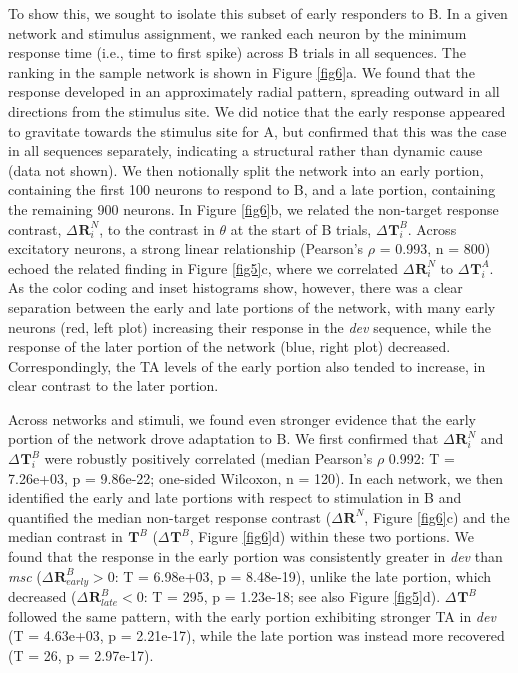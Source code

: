 \documentclass[pdflatex,referee,iicol,sn-basic]{sn-jnl}
\newcommand{\dev}{\textit{dev}}
\newcommand{\msc}{\textit{msc}}
\renewcommand{\R}[3][]{{}^{#1}_{}\mathbf{R}^{#2}_{#3}}
\renewcommand{\T}[3][]{{}^{#1}_{}\mathbf{T}^{#2}_{#3}}
\newcommand{\refpanel}[2]{Figure \ref{fig#1}\lowercase{#2}}
\begin{document}
To show this, we sought to isolate this subset of early responders to B. In a given network and stimulus assignment, we ranked each neuron by the minimum response time (i.e., time to first spike) across B trials in all sequences. The ranking in the sample network is shown in \refpanel{6}{a}. We found that the response developed in an approximately radial pattern, spreading outward in all directions from the stimulus site. We did notice that the early response appeared to gravitate towards the stimulus site for A, but confirmed that this was the case in all sequences separately, indicating a structural rather than dynamic cause (data not shown). We then notionally split the network into an early portion, containing the first 100 neurons to respond to B, and a late portion, containing the remaining 900 neurons. In \refpanel{6}{b}, we related the non-target response contrast, $\Delta \R{N}{i}$, to the contrast in $\theta$ at the start of B trials, $\Delta \T{B}{i}$. Across excitatory neurons, a strong linear relationship (Pearson's $\rho$ = 0.993, n = 800) echoed the related finding in \refpanel{5}{c}, where we correlated $\Delta \R{N}{i}$ to $\Delta \T{A}{i}$. As the color coding and inset histograms show, however, there was a clear separation between the early and late portions of the network, with many early neurons (red, left plot) increasing their response in the \dev{} sequence, while the response of the later portion of the network (blue, right plot) decreased. Correspondingly, the TA levels of the early portion also tended to increase, in clear contrast to the later portion.

Across networks and stimuli, we found even stronger evidence that the early portion of the network drove adaptation to B. We first confirmed that $\Delta \R{N}{i}$ and $\Delta \T{B}{i}$ were robustly positively correlated (median Pearson's $\rho$ 0.992: T = 7.26e+03, p = 9.86e-22; one-sided Wilcoxon, n = 120). In each network, we then identified the early and late portions with respect to stimulation in B and quantified the median non-target response contrast ($\Delta \R{N}{}$, \refpanel{6}{c}) and the median contrast in $\T{B}{}$ ($\Delta \T{B}{}$, \refpanel{6}{d}) within these two portions. We found that the response in the early portion was consistently greater in \dev{} than \msc{} ($\Delta \R{B}{early} > 0$: T = 6.98e+03, p = 8.48e-19), unlike the late portion, which decreased ($\Delta \R{B}{late} < 0$: T = 295, p = 1.23e-18; see also \refpanel{5}{d}). $\Delta \T{B}{}$ followed the same pattern, with the early portion exhibiting stronger TA in \dev{} (T = 4.63e+03, p = 2.21e-17), while the late portion was instead more recovered (T = 26, p = 2.97e-17).
\end{document}
